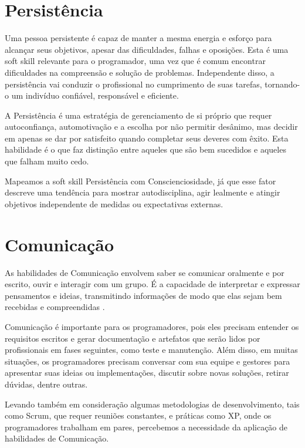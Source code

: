 \section{Persistência}

Uma pessoa persistente é capaz de manter a mesma energia e esforço para alcançar seus objetivos, apesar das dificuldades, falhas e oposições. Esta é uma soft skill relevante para o programador, uma vez que é comum encontrar dificuldades na compreensão e solução de problemas. Independente disso, a persistência vai conduzir o profissional no cumprimento de suas tarefas, tornando-o um indivíduo confiável, responsável e  eficiente.

A Persistência é uma estratégia de gerenciamento de si próprio que requer autoconfiança, automotivação e a escolha por não permitir desânimo, mas decidir em apenas se dar por satisfeito quando completar seus deveres com êxito. Esta habilidade é o que faz distinção entre aqueles que são bem sucedidos e aqueles que falham muito cedo.

Mapeamos a soft skill Persistência com Conscienciosidade, já que esse fator descreve uma tendência para mostrar autodisciplina, agir lealmente e atingir objetivos independente de medidas ou expectativas externas.

\section{Comunicação}

As habilidades de Comunicação envolvem saber se comunicar oralmente e por escrito, ouvir e interagir com um grupo. É a capacidade de  interpretar e expressar pensamentos e ideias, transmitindo informações de modo que elas sejam bem recebidas e compreendidas \cite{ahmed:12}.

Comunicação é importante para os programadores, pois eles precisam entender os requisitos escritos e gerar documentação e artefatos que serão lidos por profissionais em fases seguintes, como teste e manutenção. Além disso, em muitas situações, os programadores precisam conversar com sua equipe e gestores para apresentar suas ideias ou implementações, discutir sobre novas soluções, retirar dúvidas, dentre outras.

Levando também em consideração algumas metodologias de desenvolvimento, tais como Scrum, que requer reuniões constantes, e práticas como XP, onde os programadores trabalham em pares, percebemos a necessidade da aplicação de habilidades de Comunicação. 

